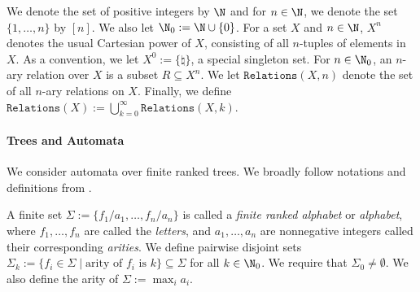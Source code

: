 \documentclass[12pt, a4paper]{article}
\newcommand{\Alphabet}{\ensuremath{\Sigma}}
\newcommand{\Relations}{\texttt{Relations}}
\begin{document}
We denote the set of positive integers by $\N$ and for $n \in \N$, we denote the set $\{1, \ldots, n\}$ by $[n]$. We also let $\N_0 := \N \cup \{0\}$. For a set $X$ and $n \in \N$, $X^n$ denotes the usual Cartesian power of $X$, consisting of all $n$-tuples of elements in $X$. As a convention, we let $X^0 := \{\natural\}$, a special singleton set.
For $n \in \N_0$, an $n$-ary relation over $X$ is a subset $R \subseteq X^n$. We let $\Relations(X, n)$ denote the set of all $n$-ary relations on $X$. Finally, we define $\Relations(X) := \bigcup_{k=0}^\infty \Relations(X, k)$.

\paragraph*{Trees and Automata}
We consider automata over finite ranked trees. We broadly follow notations and definitions from \cite{tata}.

\begin{definition}[Alphabet]\label{def:alphabet}
    A finite set $\Alphabet := \{f_1/a_1, \dots, f_n/a_n\}$ is called a \emph{finite ranked alphabet} or \emph{alphabet}, where $f_1, \dots, f_n$ are called the \emph{letters}, and $a_1, \dots, a_n$ are nonnegative integers called their corresponding \emph{arities}. We define pairwise disjoint sets $\Alphabet_k := \{f_i \in \Alphabet \mid \mbox{arity of $f_i$ is $k$}\} \subseteq \Alphabet$ for all $k \in \N_0$. We require that $\Alphabet_0 \neq \emptyset$. We also define the arity of $\Alphabet := \max_{i} a_i$.
\end{definition}
\end{document}
